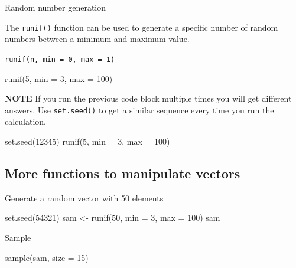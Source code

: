 \documentclass[
  letterpaper,
  DIV=11,
  numbers=noendperiod]{scrreprt}
\newenvironment{Shaded}{}{}
\newcommand{\AttributeTok}[1]{\textcolor[rgb]{0.84,0.23,0.29}{#1}}
\newcommand{\DecValTok}[1]{\textcolor[rgb]{0.00,0.36,0.77}{#1}}
\newcommand{\FunctionTok}[1]{\textcolor[rgb]{0.44,0.26,0.76}{#1}}
\newcommand{\NormalTok}[1]{\textcolor[rgb]{0.14,0.16,0.18}{#1}}
\newcommand{\OtherTok}[1]{\textcolor[rgb]{0.44,0.26,0.76}{#1}}
\begin{document}
Random number generation

The \texttt{runif()} function can be used to generate a specific number
of random numbers between a minimum and maximum value.

\texttt{runif(n,\ min\ =\ 0,\ max\ =\ 1)}

\begin{Shaded}
\begin{Highlighting}[]
\FunctionTok{runif}\NormalTok{(}\DecValTok{5}\NormalTok{, }\AttributeTok{min =} \DecValTok{3}\NormalTok{, }\AttributeTok{max =} \DecValTok{100}\NormalTok{)}
\end{Highlighting}
\end{Shaded}

\textbf{NOTE} If you run the previous code block multiple times you will
get different answers. Use \texttt{set.seed()} to get a similar sequence
every time you run the calculation.

\begin{Shaded}
\begin{Highlighting}[]
\FunctionTok{set.seed}\NormalTok{(}\DecValTok{12345}\NormalTok{)}
\FunctionTok{runif}\NormalTok{(}\DecValTok{5}\NormalTok{, }\AttributeTok{min =} \DecValTok{3}\NormalTok{, }\AttributeTok{max =} \DecValTok{100}\NormalTok{)}
\end{Highlighting}
\end{Shaded}

\subsection{More functions to manipulate
vectors}\label{more-functions-to-manipulate-vectors}

Generate a random vector with 50 elements

\begin{Shaded}
\begin{Highlighting}[]
\FunctionTok{set.seed}\NormalTok{(}\DecValTok{54321}\NormalTok{)}
\NormalTok{sam }\OtherTok{\textless{}{-}} \FunctionTok{runif}\NormalTok{(}\DecValTok{50}\NormalTok{, }\AttributeTok{min =} \DecValTok{3}\NormalTok{, }\AttributeTok{max =} \DecValTok{100}\NormalTok{)}
\NormalTok{sam}
\end{Highlighting}
\end{Shaded}

Sample

\begin{Shaded}
\begin{Highlighting}[]
\FunctionTok{sample}\NormalTok{(sam, }\AttributeTok{size =} \DecValTok{15}\NormalTok{)}
\end{Highlighting}
\end{Shaded}
\end{document}
